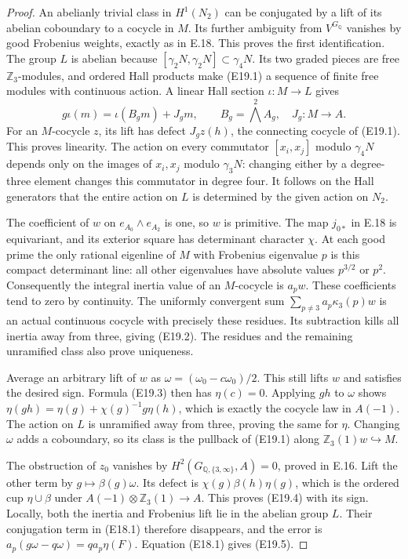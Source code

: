 \begin{proof}
An abelianly trivial class in $H^1(N_2)$ can be
conjugated by a lift of its abelian coboundary to
a cocycle in $M$. Its further ambiguity from
$V^{G_{\mathbb Q}}$ vanishes by good Frobenius
weights, exactly as in E.18. This proves the
first identification. The group $L$ is abelian
because $[\gamma_2N,\gamma_2N]\subset\gamma_4N$.
Its two graded pieces are free $\mathbb Z_3$-modules,
and ordered Hall products make (E19.1) a sequence
of finite free modules with continuous action.
A linear Hall section $\iota:M\to L$ gives
\[
 g\iota(m)=\iota(B_gm)+J_gm,
       \qquad B_g=\bigwedge^2 A_g,
       \quad J_g:M\to A.
\]
For an $M$-cocycle $z$, its lift has defect
$J_gz(h)$, the connecting cocycle of (E19.1).
This proves linearity. The action on every
commutator $[x_i,x_j]$ modulo $\gamma_4N$
depends only on the images of $x_i,x_j$ modulo
$\gamma_3N$: changing either by a degree-three
element changes this commutator in degree four.
It follows on the Hall generators that the
entire action on $L$ is determined by the
given action on $N_2$.

The coefficient of $w$ on
$e_{A_0}\wedge e_{A_2}$ is one, so $w$ is primitive.
The map $j_{0*}$ in E.18 is equivariant, and its
exterior square has determinant character $\chi$.
At each good prime the only rational eigenline
of $M$ with Frobenius eigenvalue $p$ is this
compact determinant line: all other eigenvalues
have absolute values $p^{3/2}$ or $p^2$.
Consequently the integral inertia value of an
$M$-cocycle is $a_pw$. These coefficients tend
to zero by continuity. The uniformly convergent
sum $\sum_{p\ne3}a_p\kappa_3(p)w$ is an actual
continuous cocycle with precisely these residues.
Its subtraction kills all inertia away from
three, giving (E19.2). The residues and the
remaining unramified class also prove uniqueness.

Average an arbitrary lift of $w$ as
$\omega=(\omega_0-c\omega_0)/2$.
This still lifts $w$ and satisfies the desired
sign. Formula (E19.3) then has $\eta(c)=0$.
Applying $gh$ to $\omega$ shows
$\eta(gh)=\eta(g)+\chi(g)^{-1}g\eta(h)$,
which is exactly the cocycle law in $A(-1)$.
The action on $L$ is unramified away from
three, proving the same for $\eta$.
Changing $\omega$ adds a coboundary, so its
class is the pullback of (E19.1) along
$\mathbb Z_3(1)w\hookrightarrow M$.

The obstruction of $z_0$ vanishes by
$H^2(G_{\mathbb Q,\{3,\infty\}},A)=0$,
proved in E.16. Lift the other term by
$g\mapsto\beta(g)\omega$. Its defect is
$\chi(g)\beta(h)\eta(g)$, which is the
ordered cup $\eta\cup\beta$ under
$A(-1)\otimes\mathbb Z_3(1)\to A$.
This proves (E19.4) with its sign. Locally,
both the inertia and Frobenius lift lie in
the abelian group $L$. Their conjugation
term in (E18.1) therefore disappears, and
the error is
$a_p(g\omega-q\omega)=qa_p\eta(F)$.
Equation (E18.1) gives (E19.5).


\end{proof}

